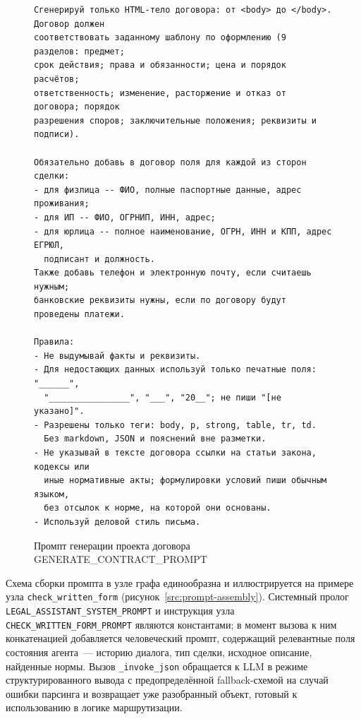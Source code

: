 \begin{figure}[H]
\begin{lstlisting}[style=promptstyle]
Сгенерируй только HTML-тело договора: от <body> до </body>. Договор должен
соответствовать заданному шаблону по оформлению (9 разделов: предмет;
срок действия; права и обязанности; цена и порядок расчётов;
ответственность; изменение, расторжение и отказ от договора; порядок
разрешения споров; заключительные положения; реквизиты и подписи).

Обязательно добавь в договор поля для каждой из сторон сделки:
- для физлица -- ФИО, полные паспортные данные, адрес проживания;
- для ИП -- ФИО, ОГРНИП, ИНН, адрес;
- для юрлица -- полное наименование, ОГРН, ИНН и КПП, адрес ЕГРЮЛ,
  подписант и должность.
Также добавь телефон и электронную почту, если считаешь нужным;
банковские реквизиты нужны, если по договору будут проведены платежи.

Правила:
- Не выдумывай факты и реквизиты.
- Для недостающих данных используй только печатные поля: "______",
  "________________", "___", "20__"; не пиши "[не указано]".
- Разрешены только теги: body, p, strong, table, tr, td.
  Без markdown, JSON и пояснений вне разметки.
- Не указывай в тексте договора ссылки на статьи закона, кодексы или
  иные нормативные акты; формулировки условий пиши обычным языком,
  без отсылок к норме, на которой они основаны.
- Используй деловой стиль письма.
\end{lstlisting}
\caption{Промпт генерации проекта договора GENERATE\_CONTRACT\_PROMPT}
\label{src:prompt-generate}
\end{figure}

Схема сборки промпта в узле графа единообразна и иллюстрируется на примере узла \texttt{check\_written\_form} (рисунок~\ref{src:prompt-assembly}). Системный пролог \texttt{LEGAL\_ASSISTANT\_SYSTEM\_PROMPT} и инструкция узла \texttt{CHECK\_WRITTEN\_FORM\_PROMPT} являются константами; в момент вызова к ним конкатенацией добавляется человеческий промпт, содержащий релевантные поля состояния агента~--- историю диалога, тип сделки, исходное описание, найденные нормы. Вызов \texttt{\_invoke\_json} обращается к LLM в режиме структурированного вывода с предопределённой fallback-схемой на случай ошибки парсинга и возвращает уже разобранный объект, готовый к использованию в логике маршрутизации.


